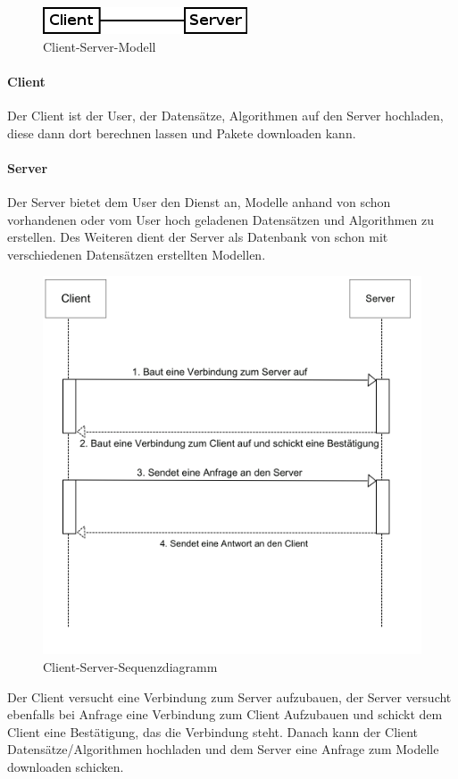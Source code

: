 %

\begin{figure}[h]
	\centering
	\includegraphics[width=0.5\linewidth]{Grafik/Diagramm/Pattern/ClientServer/Kontext.png}
	\caption[]{Client-Server-Modell}
\end{figure}

\paragraph{Client}
Der Client ist der User, der Datensätze, Algorithmen auf den Server hochladen, diese dann dort berechnen lassen und Pakete downloaden kann.

\paragraph{Server}
Der Server bietet dem User den Dienst an, Modelle anhand von schon vorhandenen oder vom User hoch geladenen Datensätzen und Algorithmen zu erstellen. Des Weiteren dient der Server als Datenbank von schon mit verschiedenen Datensätzen erstellten Modellen.\\

\begin{figure}[h]
	\centering
	\includegraphics[width=0.6\linewidth]{Grafik/Diagramm/Pattern/ClientServer/Sequenzdiagramm.png}
	\caption[]{Client-Server-Sequenzdiagramm}
\end{figure}\pagebreak
\noindent Der Client versucht eine Verbindung zum Server aufzubauen, der Server versucht ebenfalls bei Anfrage eine Verbindung zum Client Aufzubauen und schickt dem Client eine Bestätigung, das die Verbindung steht. Danach kann der Client Datensätze/Algorithmen hochladen und dem Server eine Anfrage zum Modelle downloaden schicken.
